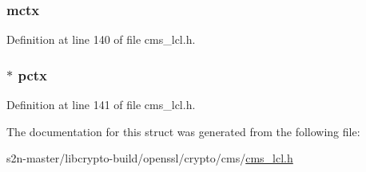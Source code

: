 \subsubsection[{\texorpdfstring{mctx}{mctx}}]{ mctx}\hypertarget{struct_c_m_s___signer_info__st_af2c9a7401ae62fd609fc0ca40fb0db96}{}\label{struct_c_m_s___signer_info__st_af2c9a7401ae62fd609fc0ca40fb0db96}


Definition at line 140 of file cms\+\_\+lcl.\+h.

\subsubsection[{\texorpdfstring{pctx}{pctx}}]{$\ast$ pctx}\hypertarget{struct_c_m_s___signer_info__st_a948d2b6093ada6d39976bf4970cd2959}{}\label{struct_c_m_s___signer_info__st_a948d2b6093ada6d39976bf4970cd2959}


Definition at line 141 of file cms\+\_\+lcl.\+h.



The documentation for this struct was generated from the following file\+:\begin{DoxyCompactItemize}
\item 
s2n-\/master/libcrypto-\/build/openssl/crypto/cms/\hyperlink{cms__lcl_8h}{cms\+\_\+lcl.\+h}\end{DoxyCompactItemize}
